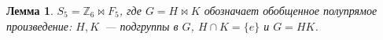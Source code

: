 \documentclass[utf8,a4paper,draft]{article}
\newtheorem{lemma_cub}{Лемма}[section]
\begin{document}
\begin{lemma_cub}
$S_5=\mathbb{Z}_6\bowtie F_5$, где $G=H\bowtie K$ обозначает обобщенное полупрямое произведение: $H, K$~--- подгруппы в $G$, $H\cap K=\{e\}$ и $G=HK$.
\end{lemma_cub}
\end{document}
